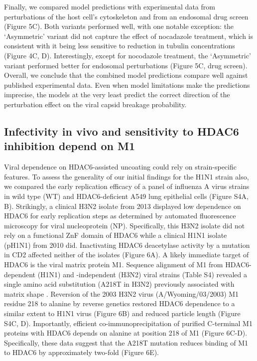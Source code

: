 Finally, we compared model predictions with experimental data from perturbations of the host cell’s cytoskeleton and from an endosomal drug screen \cite{banerjee2014influenza} (Figure 5C). Both variants performed well, with one notable exception: the ‘Asymmetric’ variant did not capture the effect of nocadazole treatment, which is consistent with it being less sensitive to reduction in tubulin concentrations (Figure 4C, D). Interestingly, except for nocodazole treatment, the ‘Asymmetric’ variant performed better for endosomal perturbations (Figure 5C, drug screen). Overall, we conclude that the combined model predictions compare well against published experimental data. Even when model limitations make the predictions imprecise, the models at the very least predict the correct direction of the perturbation effect on the viral capsid breakage probability. 

\subsection{Infectivity in vivo and sensitivity to HDAC6 inhibition depend on M1}

Viral dependence on HDAC6-assisted uncoating could rely on strain-specific features. To assess the generality of our initial findings for the H1N1 strain also, we compared the early replication efficacy of a panel of influenza A virus strains in wild type (WT) and HDAC6-deficient A549 lung epithelial cells (Figure S4A, B). Strikingly, a clinical H3N2 isolate from 2013 displayed low dependence on HDAC6 for early replication steps as determined by automated fluorescence microscopy for viral nucleoprotein (NP). Specifically, this H3N2 isolate did not rely on a functional ZnF domain of HDAC6 while a clinical H1N1 isolate (pH1N1) from 2010 did. Inactivating HDAC6 deacetylase activity by a mutation in CD2 affected neither of the isolates (Figure 6A). A likely immediate target of HDAC6 is the viral matrix protein M1. Sequence alignment of M1 from HDAC6-dependent (H1N1) and -independent (H3N2) viral strains (Table S4) revealed a single amino acid substitution (A218T in H3N2) previously associated with matrix shape \cite{elleman2004m1}. Reversion of the 2003 H3N2 virus (A/Wyoming/03/2003) M1 residue 218 to alanine by reverse genetics restored HDAC6 dependence to a similar extent to H1N1 virus (Figure 6B) and reduced particle length (Figure S4C, D). Importantly, efficient co-immunoprecipitation of purified C-terminal M1 proteins with HDAC6 depends on alanine at position 218 of M1 (Figure 6C-D). Specifically, these data suggest that the A218T mutation reduces binding of M1 to HDAC6 by approximately two-fold (Figure 6E).

